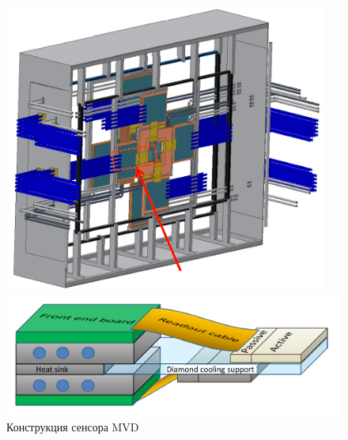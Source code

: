 
\begin{figure}[H]
\begin{minipage}[b]{0.395\textwidth}
\includegraphics[width=0.95\textwidth]{pictures/MVD_2.png}
\end{minipage}
\hspace{0.01\textwidth}
\begin{minipage}[b]{0.595\textwidth}
\includegraphics[width=1.0\textwidth]{pictures/MVD_3.png}
\end{minipage}
\caption{Конструкция сенсора MVD }
\label{fig:MVD23}
\end{figure}


